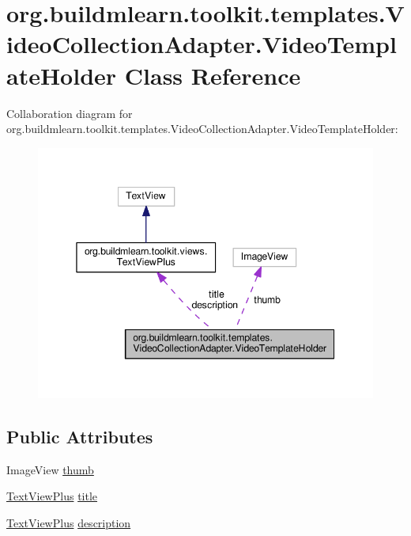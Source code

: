 \hypertarget{classorg_1_1buildmlearn_1_1toolkit_1_1templates_1_1VideoCollectionAdapter_1_1VideoTemplateHolder}{}\section{org.\+buildmlearn.\+toolkit.\+templates.\+Video\+Collection\+Adapter.\+Video\+Template\+Holder Class Reference}
\label{classorg_1_1buildmlearn_1_1toolkit_1_1templates_1_1VideoCollectionAdapter_1_1VideoTemplateHolder}


Collaboration diagram for org.\+buildmlearn.\+toolkit.\+templates.\+Video\+Collection\+Adapter.\+Video\+Template\+Holder\+:
\nopagebreak
\begin{figure}[H]
\begin{center}
\leavevmode
\includegraphics[width=345pt]{classorg_1_1buildmlearn_1_1toolkit_1_1templates_1_1VideoCollectionAdapter_1_1VideoTemplateHolder__coll__graph}
\end{center}
\end{figure}
\subsection*{Public Attributes}
\begin{DoxyCompactItemize}
\item 
Image\+View \hyperlink{classorg_1_1buildmlearn_1_1toolkit_1_1templates_1_1VideoCollectionAdapter_1_1VideoTemplateHolder_a6ef0074106c153dd54f89538b0760675}{thumb}
\item 
\hyperlink{classorg_1_1buildmlearn_1_1toolkit_1_1views_1_1TextViewPlus}{Text\+View\+Plus} \hyperlink{classorg_1_1buildmlearn_1_1toolkit_1_1templates_1_1VideoCollectionAdapter_1_1VideoTemplateHolder_a611477f821f47ee5dc30e233b8486435}{title}
\item 
\hyperlink{classorg_1_1buildmlearn_1_1toolkit_1_1views_1_1TextViewPlus}{Text\+View\+Plus} \hyperlink{classorg_1_1buildmlearn_1_1toolkit_1_1templates_1_1VideoCollectionAdapter_1_1VideoTemplateHolder_a4e32c3a225546be44ee8f0e578d589a1}{description}
\end{DoxyCompactItemize}


